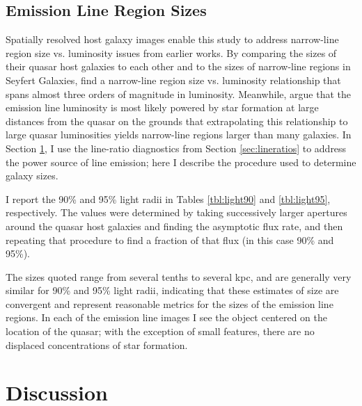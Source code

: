 \subsection{Emission Line Region Sizes}

Spatially resolved host galaxy images enable this study to address narrow-line region size vs. luminosity issues from earlier works. By comparing the sizes of their quasar host galaxies to each other and to the sizes of narrow-line regions in Seyfert Galaxies, \cite{Bennert} find a narrow-line region size vs. luminosity relationship that spans almost three orders of magnitude in luminosity. Meanwhile, \cite{Netzer2004} argue that the emission line luminosity is most likely powered by star formation at large distances from the quasar on the grounds that extrapolating this relationship to large quasar luminosities yields narrow-line regions larger than many galaxies. In Section \ref{sec:discussion},  I use the line-ratio diagnostics from Section \ref{sec:lineratios} to address the power source of line emission; here I describe the procedure used to determine galaxy sizes.

I report the 90\% and 95\% light radii in Tables \ref{tbl:light90} and \ref{tbl:light95}, respectively.  The values were determined by taking successively larger apertures around the quasar host galaxies and finding the asymptotic flux rate, and then repeating that procedure to find a fraction of that flux (in this case 90\% and 95\%).

The sizes quoted range from several tenths to several kpc, and are generally very similar for 90\% and 95\% light radii, indicating that these estimates of size are convergent and represent reasonable metrics for the sizes of the emission line regions.  In each of the emission line images I see the object centered on the location of the quasar; with the exception of small features, there are no displaced concentrations of star formation.


\section{Discussion}
\label{sec:discussion}



